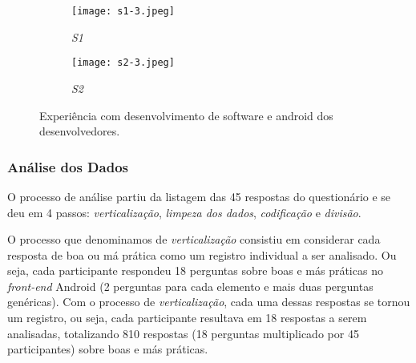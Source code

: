 \begin{figure*}[!t]
\centering
\begin{subfigure}{.5\textwidth}
 \centering
 \texttt{[image: s1-3.jpeg]}
 \caption{\textit{S1}}
 \label{fig:ExpDevsS1}
\end{subfigure}%
\begin{subfigure}{.5\textwidth}
 \centering
 \texttt{[image: s2-3.jpeg]}
 \caption{\textit{S2}}
 \label{fig:ExpDevsS2}
\end{subfigure}
\caption{Experiência com desenvolvimento de software e android dos desenvolvedores.}
\label{fig:ExpDevs}
\end{figure*}



\subsubsection{Análise dos Dados}
\label{sub:smells-definition}

O processo de análise partiu da listagem das 45 respostas do questionário e se deu em 4 passos: \textit{verticalização}, \textit{limpeza dos dados}, \textit{codificação} e \textit{divisão}.

O processo que denominamos de \textit{verticalização} consistiu em considerar cada resposta de boa ou má prática como um registro individual a ser analisado. Ou seja, cada participante respondeu 18 perguntas sobre boas e más práticas no \textit{front-end} Android (2 perguntas para cada elemento e mais duas perguntas genéricas). Com o processo de \textit{verticalização}, cada uma dessas respostas se tornou um registro, ou seja, cada participante resultava em 18 respostas a serem analisadas, totalizando 810 respostas (18 perguntas multiplicado por 45 participantes) sobre boas e más práticas.

